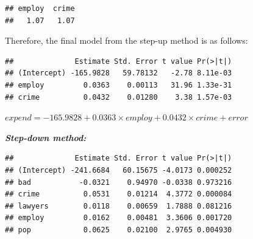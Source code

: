 \documentclass[
  10pt,
]{article}
\newenvironment{Shaded}{\begin{snugshade}}{\end{snugshade}}
\newcommand{\AttributeTok}[1]{\textcolor[rgb]{0.77,0.63,0.00}{#1}}
\newcommand{\CommentTok}[1]{\textcolor[rgb]{0.56,0.35,0.01}{\textit{#1}}}
\newcommand{\FunctionTok}[1]{\textcolor[rgb]{0.00,0.00,0.00}{#1}}
\newcommand{\NormalTok}[1]{#1}
\newcommand{\SpecialCharTok}[1]{\textcolor[rgb]{0.00,0.00,0.00}{#1}}
\begin{document}
\begin{verbatim}
## employ  crime 
##   1.07   1.07
\end{verbatim}

Therefore, the final model from the step-up method is as follows:

\begin{Shaded}
\end{Shaded}

\begin{verbatim}
##              Estimate Std. Error t value Pr(>|t|)
## (Intercept) -165.9828   59.78132   -2.78 8.11e-03
## employ         0.0363    0.00113   31.96 1.33e-31
## crime          0.0432    0.01280    3.38 1.57e-03
\end{verbatim}

\(expend = -165.9828 + 0.0363 \times employ + 0.0432 \times crime + error\)

\textbf{\emph{Step-down method:}}

\begin{Shaded}
\end{Shaded}

\begin{verbatim}
##              Estimate Std. Error t value Pr(>|t|)
## (Intercept) -241.6684   60.15675 -4.0173 0.000252
## bad           -0.0321    0.94970 -0.0338 0.973216
## crime          0.0531    0.01214  4.3772 0.000084
## lawyers        0.0118    0.00659  1.7888 0.081216
## employ         0.0162    0.00481  3.3606 0.001720
## pop            0.0625    0.02100  2.9765 0.004930
\end{verbatim}

\begin{Shaded}
\end{Shaded}
\end{document}
